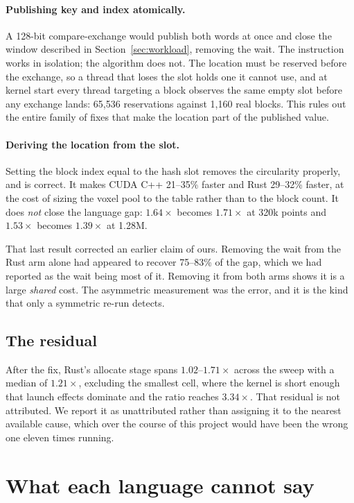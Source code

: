 \documentclass[11pt]{article}
\begin{document}
\paragraph{Publishing key and index atomically.} A 128-bit compare-exchange
would publish both words at once and close the window described in
Section~\ref{sec:workload}, removing the wait. The instruction works in
isolation; the algorithm does not. The location must be reserved before the
exchange, so a thread that loses the slot holds one it cannot use, and at kernel
start every thread targeting a block observes the same empty slot before any
exchange lands: 65{,}536 reservations against 1{,}160 real blocks. This rules out
the entire family of fixes that make the location part of the published value.

\paragraph{Deriving the location from the slot.} Setting the block index equal to
the hash slot removes the circularity properly, and is correct. It makes CUDA C++
21--35\% faster and Rust 29--32\% faster, at the cost of sizing the voxel pool to
the table rather than to the block count. It does \emph{not} close the language
gap: $1.64\times$ becomes $1.71\times$ at 320k points and $1.53\times$ becomes
$1.39\times$ at 1.28M.

That last result corrected an earlier claim of ours. Removing the wait from the
Rust arm alone had appeared to recover 75--83\% of the gap, which we had reported
as the wait being most of it. Removing it from both arms shows it is a large
\emph{shared} cost. The asymmetric measurement was the error, and it is the kind
that only a symmetric re-run detects.

\subsection{The residual}

After the fix, Rust's allocate stage spans $1.02$--$1.71\times$ across the
sweep with a median of $1.21\times$, excluding the smallest cell, where the
kernel is short enough that launch effects dominate and the ratio reaches
$3.34\times$. That residual is not attributed. We report it as unattributed
rather than assigning it to the nearest available cause, which over the course of
this project would have been the wrong one eleven times running.

\section{What each language cannot say}
\label{sec:expressiveness}
\end{document}
